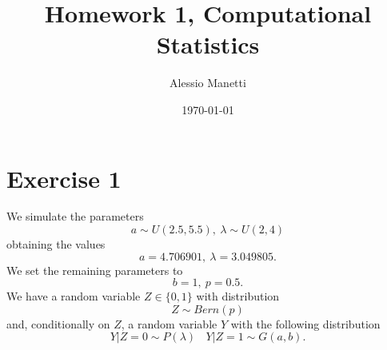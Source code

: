 \documentclass[a4paper,12pt]{article}
\title{Homework 1, Computational Statistics}
\author{Alessio Manetti}
\date{\today}  %
\begin{document}
\maketitle
\tableofcontents  %

\newpage

\section{Exercise 1}
We simulate the parameters
\[a \sim U(2.5,5.5), \ \lambda \sim U(2,4)\]
obtaining the values
\[a = 4.706901, \ \lambda = 3.049805.\]
We set the remaining parameters to
\[b = 1, \ p = 0.5.\]
We have a random variable \(Z \in \{0,1\}\) with distribution
\[Z \sim Bern(p)\]
and, conditionally on \(Z\), a random variable \(Y\) with the following distribution
\[Y|Z=0 \sim P(\lambda) \ \ \ \ Y|Z=1 \sim G(a,b).\]
\end{document}
